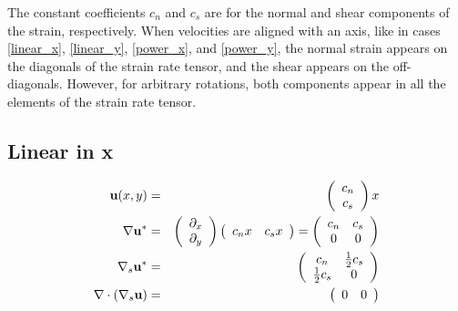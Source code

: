 \documentclass[11pt]{report}
\begin{document}
The constant coefficients $c_n$ and $c_s$ are for the normal and shear components of the strain, respectively.  When velocities are aligned with an axis, like in cases \ref{linear_x}, \ref{linear_y}, \ref{power_x}, and \ref{power_y}, the normal strain appears on the diagonals of the strain rate tensor, and the shear appears on the off-diagonals.  However, for arbitrary rotations, both components appear in all the elements of the strain rate tensor.

\subsection{Linear in x\label{linear_x}}
\begin{eqnarray}
{\bf u}(x,y) &=& \left( \begin{array}{c} c_n \\ c_s \end{array}   \right)x \\
\nabla{\bf u}^* &=& \left( \begin{array}{c} \partial_x \\ \partial_y \end{array}   \right) \left( \begin{array}{cc} c_nx & c_sx \end{array}   \right)
 =  \left( \begin{array}{cc} c_n & c_s \\ 0 & 0 \end{array}   \right) \\
\nabla_s{\bf u}^* &=&  \left( \begin{array}{cc} c_n & \frac{1}{2}c_s \\ \frac{1}{2}c_s & 0 \end{array}   \right) \\
\nabla\cdot\left(\nabla_s{\bf u}\right) &=&  \left( \begin{array}{cc} 0 & 0 \end{array}   \right)
\end{eqnarray}
\end{document}
